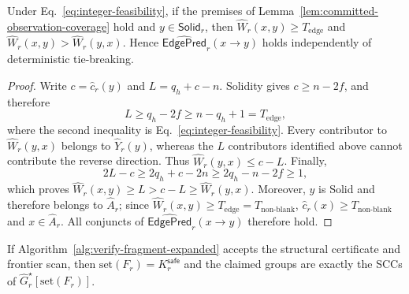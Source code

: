 \begin{lemma}
\label{lem:fair-edge-formation}
Under Eq.~\eqref{eq:integer-feasibility}, if the premises of
Lemma~\ref{lem:committed-observation-coverage} hold and
$y\in\mathsf{Solid}_r$, then
$\widehat W_r(x,y)\ge T_{\mathrm{edge}}$ and
$\widehat W_r(x,y)>\widehat W_r(y,x)$.  Hence
$\widehat{\mathsf{EdgePred}}_r(x\to y)$ holds independently
of deterministic tie-breaking.
\end{lemma}

\begin{proof}
Write $c=\widehat c_r(y)$ and $L=q_h+c-n$.  Solidity gives
$c\ge n-2f$, and therefore
\[
 L\ge q_h-2f\ge n-q_h+1=T_{\mathrm{edge}},
\]
where the second inequality is Eq.~\eqref{eq:integer-feasibility}.  Every
contributor to $\widehat W_r(y,x)$ belongs to $\widehat Y_r(y)$, whereas the $L$ contributors
identified above cannot contribute the reverse direction.  Thus
$\widehat W_r(y,x)\le c-L$.  Finally,
\[
 2L-c\ge2q_h+c-2n\ge2q_h-n-2f\ge1,
\]
which proves
$\widehat W_r(x,y)\ge L>c-L\ge\widehat W_r(y,x)$.  Moreover, $y$ is Solid and
therefore belongs to $\widehat A_r$; since
$\widehat W_r(x,y)\ge T_{\mathrm{edge}}=T_{\mathrm{non\mbox{-}blank}}$,
$\widehat c_r(x)\ge T_{\mathrm{non\mbox{-}blank}}$ and
$x\in\widehat A_r$.  All conjuncts of
$\widehat{\mathsf{EdgePred}}_r(x\to y)$ therefore
hold.
\end{proof}

\begin{lemma}
\label{lem:safe-closure-certificate}
If Algorithm~\ref{alg:verify-fragment-expanded} accepts the structural certificate and
frontier scan, then $\mathrm{set}(F_r)=K_r^{\mathsf{safe}}$ and the claimed
groups are exactly the SCCs of
$\widehat G_r^\star[\mathrm{set}(F_r)]$.
\end{lemma}

